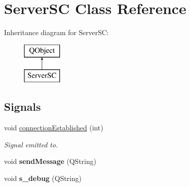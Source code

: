 \hypertarget{classServerSC}{}\section{Server\+SC Class Reference}
\label{classServerSC}
Inheritance diagram for Server\+SC\+:\begin{figure}[H]
\begin{center}
\leavevmode
\includegraphics[height=2.000000cm]{classServerSC}
\end{center}
\end{figure}
\subsection*{Signals}
\begin{DoxyCompactItemize}
\item 
void \hyperlink{classServerSC_aa2c6d7cead4892c210a2c2a535f8f00e}{connection\+Established} (int)\hypertarget{classServerSC_aa2c6d7cead4892c210a2c2a535f8f00e}{}\label{classServerSC_aa2c6d7cead4892c210a2c2a535f8f00e}

\begin{DoxyCompactList}\small\item\em Signal emitted to. \end{DoxyCompactList}\item 
void {\bfseries send\+Message} (Q\+String)\hypertarget{classServerSC_a939f52aa74d902207ef986b4e01d46cd}{}\label{classServerSC_a939f52aa74d902207ef986b4e01d46cd}

\item 
void {\bfseries s\+\_\+debug} (Q\+String)\hypertarget{classServerSC_ac8855e3bdddb9a31c127678404673829}{}\label{classServerSC_ac8855e3bdddb9a31c127678404673829}

\end{DoxyCompactItemize}
